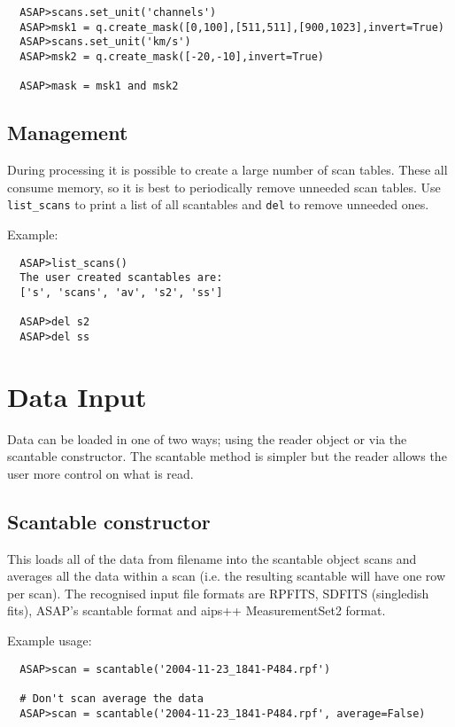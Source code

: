 \documentclass[11pt]{article}
\newcommand{\cmd}[1]{{\tt #1}}
\begin{document}
\begin{verbatim}
  ASAP>scans.set_unit('channels')
  ASAP>msk1 = q.create_mask([0,100],[511,511],[900,1023],invert=True)
  ASAP>scans.set_unit('km/s')
  ASAP>msk2 = q.create_mask([-20,-10],invert=True)

  ASAP>mask = msk1 and msk2
\end{verbatim}


\subsection{Management}

During processing it is possible to create
a large number of scan tables. These all consume memory, so it is best
to periodically remove unneeded scan tables. Use \cmd{list\_scans} to
print a list of all scantables and \cmd{del} to remove unneeded ones.

Example:

\begin{verbatim}
  ASAP>list_scans()
  The user created scantables are:
  ['s', 'scans', 'av', 's2', 'ss']

  ASAP>del s2
  ASAP>del ss
\end{verbatim}

\section{Data Input}

Data can be loaded in one of two ways; using the
reader object or via the scantable constructor. The scantable method
is simpler but the reader allows the user more control on what is read.

\subsection{Scantable constructor}

This loads
all of the data from filename into the scantable object scans and
averages all the data within a scan (i.e.  the resulting scantable
will have one row per scan).  The recognised input file formats are
RPFITS, SDFITS (singledish fits), ASAP's scantable format and aips++
MeasurementSet2 format.

Example usage:

\begin{verbatim}
  ASAP>scan = scantable('2004-11-23_1841-P484.rpf')

  # Don't scan average the data
  ASAP>scan = scantable('2004-11-23_1841-P484.rpf', average=False)
\end{verbatim}
\end{document}
